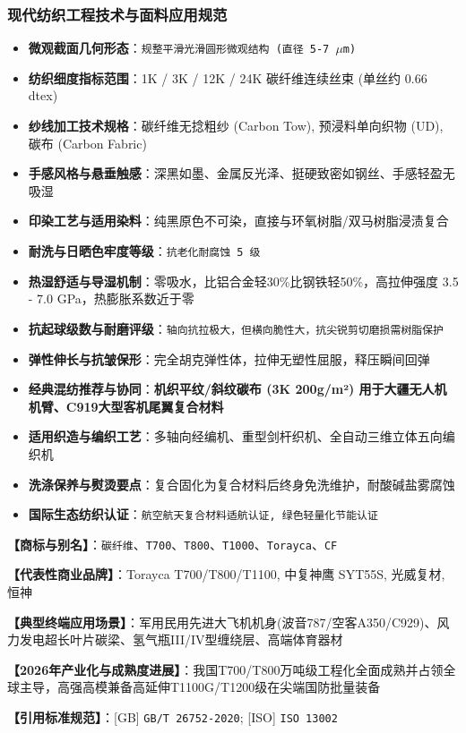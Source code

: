 \documentclass[11pt,openright,twoside,UTF8]{ctexbook}
\begin{document}
\subsubsection*{现代纺织工程技术与面料应用规范}
\begin{itemize} \setlength{\itemsep}{2pt}
    \item \textbf{微观截面几何形态}：\texttt{规整平滑光滑圆形微观结构 (直径 5-7 $\mu$m)}
    \item \textbf{纺织细度指标范围}：1K / 3K / 12K / 24K 碳纤维连续丝束 (单丝约 0.66 dtex)
    \item \textbf{纱线加工技术规格}：碳纤维无捻粗纱 (Carbon Tow), 预浸料单向织物 (UD), 碳布 (Carbon Fabric)
    \item \textbf{手感风格与悬垂触感}：深黑如墨、金属反光泽、挺硬致密如钢丝、手感轻盈无吸湿
    \item \textbf{印染工艺与适用染料}：纯黑原色不可染，直接与环氧树脂/双马树脂浸渍复合
    \item \textbf{耐洗与日晒色牢度等级}：\texttt{抗老化耐腐蚀 5 级}
    \item \textbf{热湿舒适与导湿机制}：零吸水，比铝合金轻30\%比钢铁轻50\%，高拉伸强度 3.5 - 7.0 GPa，热膨胀系数近于零
    \item \textbf{抗起球级数与耐磨评级}：\texttt{轴向抗拉极大，但横向脆性大，抗尖锐剪切磨损需树脂保护}
    \item \textbf{弹性伸长与抗皱保形}：完全胡克弹性体，拉伸无塑性屈服，释压瞬间回弹
    \item \textbf{经典混纺推荐与协同}：\textbf{机织平纹/斜纹碳布 (3K 200g/m²) 用于大疆无人机机臂、C919大型客机尾翼复合材料}
    \item \textbf{适用织造与编织工艺}：多轴向经编机、重型剑杆织机、全自动三维立体五向编织机
    \item \textbf{洗涤保养与熨烫要点}：复合固化为复合材料后终身免洗维护，耐酸碱盐雾腐蚀
    \item \textbf{国际生态纺织认证}：\texttt{航空航天复合材料适航认证, 绿色轻量化节能认证}
\end{itemize}
\vspace{0.2cm}

\noindent\textbf{【商标与别名】}：\texttt{碳纤维}、\texttt{T700}、\texttt{T800}、\texttt{T1000}、\texttt{Torayca}、\texttt{CF}\par
\noindent\textbf{【代表性商业品牌】}：Torayca T700/T800/T1100, 中复神鹰 SYT55S, 光威复材, 恒神\par
\noindent\textbf{【典型终端应用场景】}：军用民用先进大飞机机身(波音787/空客A350/C929)、风力发电超长叶片碳梁、氢气瓶III/IV型缠绕层、高端体育器材\par
\noindent\textbf{【2026年产业化与成熟度进展】}：我国T700/T800万吨级工程化全面成熟并占领全球主导，高强高模兼备高延伸T1100G/T1200级在尖端国防批量装备\par
\noindent\textbf{【引用标准规范】}：[GB] \texttt{GB/T 26752-2020}; [ISO] \texttt{ISO 13002}\par
\vspace{0.5cm}
\end{document}
